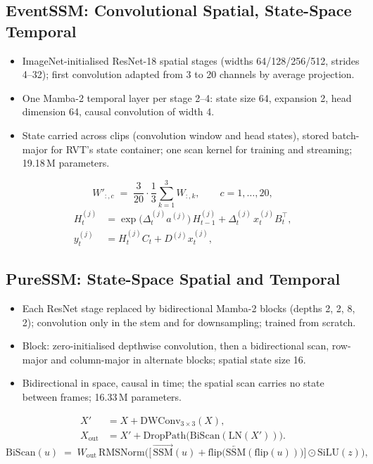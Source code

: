 \documentclass[11pt, a4paper]{report}
\begin{document}
\subsection{EventSSM: Convolutional Spatial, State-Space Temporal}
\begin{itemize}
  \item ImageNet-initialised ResNet-18 spatial stages (widths 64/128/256/512, strides 4--32); first convolution adapted from 3 to 20 channels by average projection.
  \item One Mamba-2 temporal layer per stage 2--4: state size 64, expansion 2, head dimension 64, causal convolution of width 4.
  \item State carried across clips (convolution window and head states), stored batch-major for RVT's state container; one scan kernel for training and streaming; 19.18\,M parameters.
\end{itemize}
\begin{equation}
  W'_{:,c} \;=\; \frac{3}{20}\cdot\frac{1}{3}\sum_{k=1}^{3} W_{:,k}, \qquad c = 1,\dots,20,
  \label{eq:avg_projection}
\end{equation}
\begin{align}
  H^{(j)}_t &= \exp\!\big(\Delta^{(j)}_t a^{(j)}\big)\, H^{(j)}_{t-1} + \Delta^{(j)}_t\, x^{(j)}_t B_t^{\top},
  \label{eq:mamba2_state}\\
  y^{(j)}_t &= H^{(j)}_t C_t + D^{(j)} x^{(j)}_t,
  \label{eq:mamba2_out}
\end{align}

\subsection{PureSSM: State-Space Spatial and Temporal}
\begin{itemize}
  \item Each ResNet stage replaced by bidirectional Mamba-2 blocks (depths 2, 2, 8, 2); convolution only in the stem and for downsampling; trained from scratch.
  \item Block: zero-initialised depthwise convolution, then a bidirectional scan, row-major and column-major in alternate blocks; spatial state size 16.
  \item Bidirectional in space, causal in time; the spatial scan carries no state between frames; 16.33\,M parameters.
\end{itemize}
\begin{align}
  X' &= X + \mathrm{DWConv}_{3\times3}(X), \label{eq:bimamba_local}\\
  X_{\mathrm{out}} &= X' + \mathrm{DropPath}\big(\mathrm{BiScan}(\mathrm{LN}(X'))\big). \label{eq:bimamba_block}
\end{align}
\begin{equation}
  \mathrm{BiScan}(u) \;=\; W_{\mathrm{out}}\,\mathrm{RMSNorm}\Big(\big[\,\overrightarrow{\mathrm{SSM}}(u)
  + \mathrm{flip}\big(\overleftarrow{\mathrm{SSM}}(\mathrm{flip}(u))\big)\big]\odot\mathrm{SiLU}(z)\Big),
  \label{eq:biscan}
\end{equation}
\end{document}
